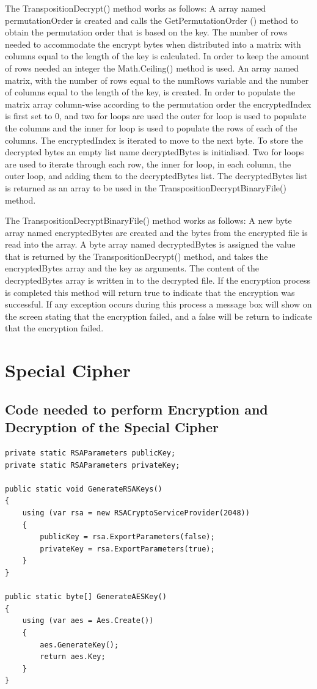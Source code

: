 \documentclass[a4paper,oneside,11pt]{book}
\begin{document}
The TranspositionDecrypt() method works as follows:
A array named permutationOrder is created and calls the GetPermutationOrder () method to obtain the permutation order that is based on the key. The number of rows needed to accommodate the encrypt bytes when distributed into a matrix with columns equal to the length of the key is calculated. In order to keep the amount of rows needed an integer the Math.Ceiling() method is used. An array named matrix, with the number of rows equal to the numRows variable and the number of columns equal to the length of the key, is created. In order to populate the matrix array column-wise according to the permutation order the encryptedIndex is first set to 0, and two for loops are used the outer for loop is used to populate the columns and the inner for loop is used to populate the rows of each of the columns. The encryptedIndex is iterated to move to the next byte. To store the decrypted bytes an empty list name decryptedBytes is initialised. Two for loops are used to iterate through each row, the inner for loop, in each column, the outer loop, and adding them to the decryptedBytes list. The decryptedBytes list is returned as an array to be used in the TranspositionDecryptBinaryFile() method.

The TranspositionDecryptBinaryFile() method works as follows:
A new byte array named encryptedBytes are created and the bytes from the encrypted file is read into the array. A byte array named decryptedBytes is assigned the value that is returned by the TranspositionDecrypt() method, and takes the encryptedBytes array and the key as arguments. The content of the decryptedBytes array is written in to the decrypted file. If the encryption process is completed this method will return true to indicate that the encryption was successful. If any exception occurs during this process a message box will show on the screen stating that the encryption failed, and a false will be return to indicate that the encryption failed.

\chapter[Special Cipher]{Special Cipher}

\section{Code needed to perform Encryption and Decryption of the Special Cipher}
\begin{lstlisting}[language=Csh, caption={Code for Special Cipher}]
private static RSAParameters publicKey;
private static RSAParameters privateKey;

public static void GenerateRSAKeys()
{
    using (var rsa = new RSACryptoServiceProvider(2048))
    {
        publicKey = rsa.ExportParameters(false);
        privateKey = rsa.ExportParameters(true); 
    }
}

public static byte[] GenerateAESKey()
{
    using (var aes = Aes.Create())
    {
        aes.GenerateKey();
        return aes.Key;
    }
}
\end{lstlisting}
\end{document}
